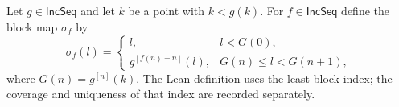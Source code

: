 \begin{definition}
Let $g\in\mathsf{IncSeq}$ and let $k$ be a point with $k<g(k)$.  For
$f\in\mathsf{IncSeq}$ define the block map $\sigma_f$ by
\[
\sigma_f(l)=
\begin{cases}
l,&l<G(0),\\
g^{[f(n)-n]}(l),&G(n)\leq l<G(n+1),
\end{cases}
\]
where $G(n)=g^{[n]}(k)$.  The Lean definition uses the least block index;
the coverage and uniqueness of that index are recorded separately.
\end{definition}
